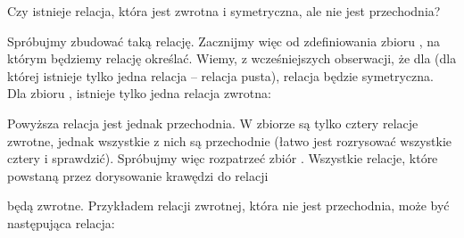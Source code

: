 \begin{example}
Czy istnieje relacja, która jest zwrotna i symetryczna, ale nie jest przechodnia? 

Spróbujmy zbudować taką relację. Zacznijmy więc od zdefiniowania zbioru , na którym będziemy relację określać. Wiemy, z wcześniejszych obserwacji, że dla  (dla której istnieje tylko jedna relacja -- relacja pusta), relacja będzie symetryczna. Dla zbioru , istnieje tylko jedna relacja zwrotna:

\begin{center}
\end{center}

Powyższa relacja jest jednak przechodnia. W zbiorze  są tylko cztery relacje zwrotne, jednak wszystkie z nich są przechodnie (łatwo jest rozrysować wszystkie cztery i sprawdzić). Spróbujmy więc rozpatrzeć zbiór . Wszystkie relacje, które powstaną przez dorysowanie krawędzi do relacji 

\begin{center}
\end{center}

będą zwrotne. Przykładem relacji zwrotnej, która nie jest przechodnia, może być następująca relacja:

\begin{center}
\end{center}


\end{example}
